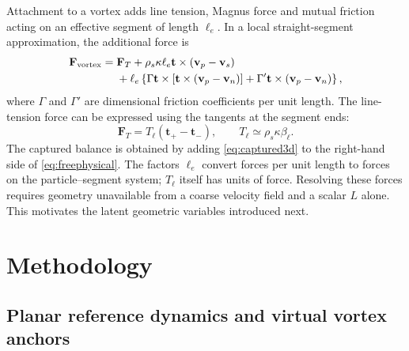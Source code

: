 \documentclass[11pt]{article}
\numberwithin{equation}{section}
\begin{document}
Attachment to a vortex adds line tension, Magnus force and mutual friction acting on an effective segment of length $\ell_e$. In a local straight-segment approximation, the additional force is
\begin{equation}
 \begin{aligned}
 \mathbf F_{\rm vortex}={}&\mathbf F_T
 +\rho_s\kappa\ell_e\mathbf t\times(\mathbf v_p-\mathbf v_s)\\
 &+\ell_e\left\{
 \Gamma\mathbf t\times[\mathbf t\times(\mathbf v_p-\mathbf v_n)]
 +\Gamma'\mathbf t\times(\mathbf v_p-\mathbf v_n)\right\},
 \end{aligned}
 \label{eq:captured3d}
\end{equation}
where $\Gamma$ and $\Gamma'$ are dimensional friction coefficients per unit length. The line-tension force can be expressed using the tangents at the segment ends:
\begin{equation}
 \mathbf F_T=T_\ell(\mathbf t_+-\mathbf t_-),
 \qquad T_\ell\simeq\rho_s\kappa\beta_\ell.
 \label{eq:linetension}
\end{equation}
The captured balance is obtained by adding \eqref{eq:captured3d} to the right-hand side of \eqref{eq:freephysical}. The factors $\ell_e$ convert forces per unit length to forces on the particle--segment system; $T_\ell$ itself has units of force. Resolving these forces requires geometry unavailable from a coarse velocity field and a scalar $L$ alone. This motivates the latent geometric variables introduced next.

\section{Methodology}
\label{sec:methodology}

\subsection{Planar reference dynamics and virtual vortex anchors}
\label{sec:reference}
\end{document}
